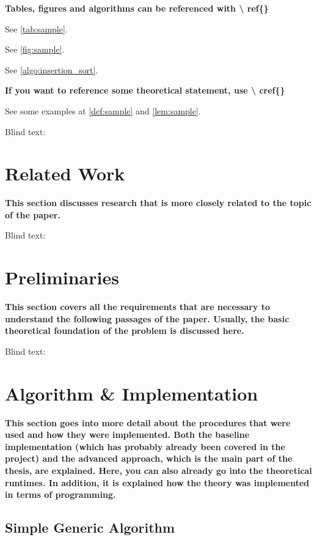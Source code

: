 \textbf{Tables, figures and algorithms can be referenced with \textbackslash
ref\{\}}

See \cref{tab:sample}.

See \cref{fig:sample}.

See \cref{algo:insertion_sort}.

\textbf{If you want to reference some theoretical statement, use \textbackslash
cref\{\}}

See some examples at \cref{def:sample} and \cref{lem:sample}.

Blind text:

\lipsum[1-2]


\section{Related Work}
\label{sec:related_work}

\textbf{This section discusses research that is more closely related to the
topic of the paper.}

Blind text:

\lipsum[1-2]


\section{Preliminaries}
\label{sec:preliminaries}

\textbf{This section covers all the requirements that are necessary to
understand the following passages of the paper. Usually, the basic theoretical
foundation of the problem is discussed here.}

Blind text:

\lipsum[1-2]


\section{Algorithm \& Implementation}
\label{sec:algorithm_implementation}

\textbf{This section goes into more detail about the procedures that were used
and how they were implemented. Both the baseline implementation (which has
probably already been covered in the project) and the advanced approach, which
is the main part of the thesis, are explained. Here, you can also already go
into the theoretical runtimes. In addition, it is explained how the theory was
implemented in terms of programming. }

\subsection{Simple Generic Algorithm}
\label{subsec:simple_algo}

